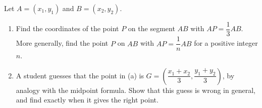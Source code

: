 Let $A=(x_1,y_1)$ and $B=(x_2,y_2)$.
\begin{enumerate}
\item[(a)] Find the coordinates of the point $P$ on the segment $AB$ with $AP=\dfrac13AB$. More generally, find the point $P$ on $AB$ with $AP=\dfrac1nAB$ for a positive integer $n$.
\item[(b)] A student guesses that the point in (a) is $G=\left(\dfrac{x_1+x_2}{3},\dfrac{y_1+y_2}{3}\right)$, by analogy with the midpoint formula. Show that this guess is wrong in general, and find exactly when it gives the right point.
\end{enumerate}
